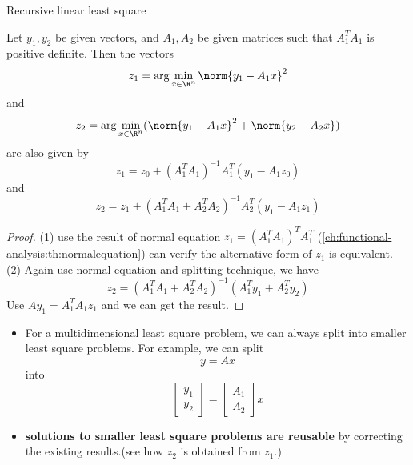 \begin{refsection}
\begin{algorithm}[H]
		\caption{Recursive linear least square}
\end{algorithm}

\begin{lemma}\cite[160]{bertsekas2016nonlinear}
Let $y_1,y_2$ be given vectors, and $A_1,A_2$ be given matrices such that $A_1^TA_1$ is positive definite. Then the vectors
$$z_1 = \arg\min_{x\in \R^n} \norm{y_1 - A_1x}^2$$
and 
$$z_2 = \arg\min_{x\in \R^n} (\norm{y_1 - A_1x}^2 + \norm{y_2-A_2x})$$
are also given by 
$$z_1 = z_0 + (A_1^TA_1)^{-1}A_1^T(y_1 - A_1z_0)$$
and
$$z_2 = z_1 + (A_1^TA_1 + A_2^TA_2)^{-1}A_2^T(y_1 - A_1z_1)$$
\end{lemma}
\begin{proof}
(1) use the result of normal equation $z_1 = (A_1^TA_1)^TA_1^T $ (\autoref{ch:functional-analysis:th:normalequation}) can verify the alternative form of $z_1$ is equivalent.	
(2) Again use normal equation and splitting technique, we have
$$z_2 = (A_1^TA_1 + A_2^TA_2)^{-1}(A_1^Ty_1 + A_2^Ty_2)$$
Use $Ay_1 = A_1^TA_1z_1$ and we can get the result.
\end{proof}




\begin{remark}\hfill
\begin{itemize}
		\item For a multidimensional least square problem, we can always split into smaller least square problems. For example, we can split
		$$y = Ax$$ into
		$$\begin{bmatrix}
		y_1\\
		y_2
		\end{bmatrix} = \begin{bmatrix}
		A_1\\
		A_2
		\end{bmatrix} x$$
		\item \textbf{solutions to smaller least square problems are reusable} by correcting the existing results.(see how $z_2$ is obtained from $z_1$.)
\end{itemize}

\end{remark}




\end{refsection}
